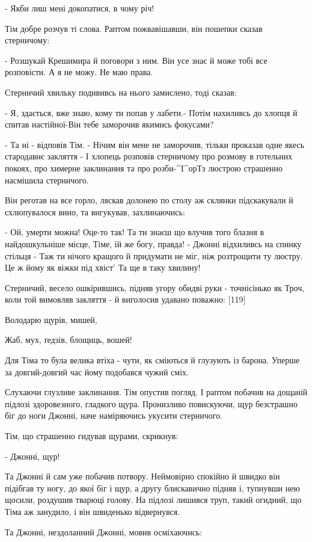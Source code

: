 - Якби лиш мені докопатися, в чому річ!

Тім добре розчув ті слова. Раптом пожвавішавши, він пошепки сказав стерничому:

- Розшукай Крешимира й поговори з ним. Він усе знає й може тобі все розповісти. А я не можу. Не маю права.

Стерничий хвильку подививсь на нього замислено, тоді сказав:

- Я, здається, вже знаю, кому ти попав у лабети.- Потім нахиливсь до хлопця й спитав настійної-Він тебе заморочив якимись фокусами?

- Та ні - відповів Тім. - Нічим він мене не заморочив, тільки проказав одне якесь стародавнє закляття - І хлопець розповів стерничому про розмову в готельних покоях, про химерне заклинання та про розби-^І^орТз люстрою страшенно насмішила стерничого.

Він реготав на все горло, ляскав долонею по столу аж склянки підскакували й схлюпувалося вино, та вигукував, захлинаючись:

- Ой, умерти можна! Оце-то так! Та ти знаєш що влучив того блазня в найдошкульніше місце, Тіме, їй же богу, правда! - Джонні відхиливсь на спинку стільця - Таж ти нічого кращого й придумати не міг, ніж розтрощити ту люстру. Це ж йому як віжки під хвіст' Та ще в таку хвилину!

Стерничий, весело ошкірившись, підняв угору обидві руки - точнісінько як Троч, коли той вимовляв закляття - й виголосив удавано поважно: [119]

Володарю щурів, мишей,

Жаб, мух, ґедзів, блощиць, вошей!

Для Тіма то була велика втіха - чути, як сміються й глузують із барона. Уперше за довгий-довгий час йому подобався чужий сміх.

Слухаючи глузливе заклинання. Тім опустив погляд. І раптом побачив на дощаній підлозі здоровезного, гладкого щура. Пронизливо повискуючи, щур безстрашно біг до ноги Джонні, наче наміряючись укусити стерничого.

Тім, що страшенно гидував щурами, скрикнув:

- Джонні, щур!

Та Джонні й сам уже побачив потвору. Неймовірно спокійно й швидко він підібгав ту ногу, до якої біг і щур, а другу блискавично підняв і, тупнувши нею щосили, роздушив тварюці голову. На підлозі лишився труп, такий огидний, що Тіма аж занудило, і він швиденько відвернувся.

Та Джонні, нездоланний Джонні, мовив осміхаючись:

